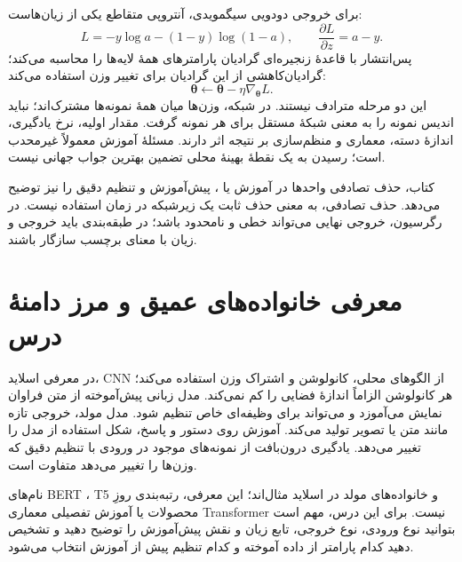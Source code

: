 \documentclass[12pt,a4paper,oneside]{report}
\begin{document}
برای خروجی دودویی سیگمویدی، آنتروپی متقاطع یکی از زیان‌هاست:
\[L=-y\log a-(1-y)\log(1-a),\qquad \frac{\partial L}{\partial z}=a-y.\]
پس‌انتشار با قاعدهٔ زنجیره‌ای گرادیان پارامترهای همهٔ لایه‌ها را محاسبه می‌کند؛ گرادیان‌کاهشی از این گرادیان برای تغییر وزن استفاده می‌کند:
\[\boldsymbol\theta\leftarrow\boldsymbol\theta-\eta\nabla_{\boldsymbol\theta}L.\]
این دو مرحله مترادف نیستند. در شبکه، وزن‌ها میان همهٔ نمونه‌ها مشترک‌اند؛ نباید اندیس نمونه را به معنی شبکهٔ مستقل برای هر نمونه گرفت. مقدار اولیه، نرخ یادگیری، اندازهٔ دسته، معماری و منظم‌سازی بر نتیجه اثر دارند. مسئلهٔ آموزش معمولاً غیرمحدب است؛ رسیدن به یک نقطهٔ بهینهٔ محلی تضمین بهترین جواب جهانی نیست.

کتاب، حذف تصادفی واحدها در آموزش یا ، پیش‌آموزش و تنظیم دقیق را نیز توضیح می‌دهد. حذف تصادفی، به معنی حذف ثابت یک زیرشبکه در زمان استفاده نیست. در رگرسیون، خروجی نهایی می‌تواند خطی و نامحدود باشد؛ در طبقه‌بندی باید خروجی و زیان با معنای برچسب سازگار باشند.

\section{معرفی خانواده‌های عمیق و مرز دامنهٔ درس}
در معرفی اسلاید، CNN از الگوهای محلی، کانولوشن و اشتراک وزن استفاده می‌کند؛ هر کانولوشن الزاماً اندازهٔ فضایی را کم نمی‌کند. مدل زبانی پیش‌آموخته از متن فراوان نمایش می‌آموزد و می‌تواند برای وظیفه‌ای خاص تنظیم شود. مدل مولد، خروجی تازه مانند متن یا تصویر تولید می‌کند. آموزش روی دستور و پاسخ، شکل استفاده از مدل را تغییر می‌دهد. یادگیری درون‌بافت از نمونه‌های موجود در ورودی با تنظیم دقیق که وزن‌ها را تغییر می‌دهد متفاوت است.

نام‌های BERT ، T5 و خانواده‌های مولد در اسلاید مثال‌اند؛ این معرفی، رتبه‌بندی روزِ محصولات یا آموزش تفصیلی معماری Transformer نیست. برای این درس، مهم است بتوانید نوع ورودی، نوع خروجی، تابع زیان و نقش پیش‌آموزش را توضیح دهید و تشخیص دهید کدام پارامتر از داده آموخته و کدام تنظیم پیش از آموزش انتخاب می‌شود.
\end{document}
